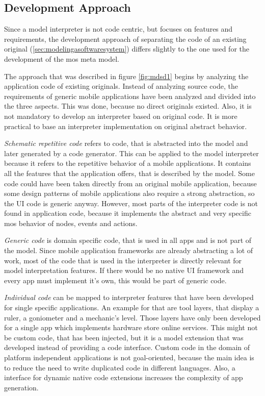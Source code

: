 \subsection{Development Approach}

Since a model interpreter is not code centric, but focuses on features and requirements, the development approach of separating the code of an existing original (\ref{sec:modelingasoftwaresystem}) differs slightly to the one used for the development of the \ac{mos} meta model.

The approach that was described in figure \ref{fig:mdsd1} begins by analyzing the application code of existing originals.
Instead of analyzing source code, the requirements of generic mobile applications have been analyzed and divided into the three aspects.
This was done, because no direct originals existed.
Also, it is not mandatory to develop an interpreter based on original code.
It is more practical to base an interpreter implementation on original abstract behavior.

\textit{Schematic repetitive code} refers to code, that is abstracted into the model and later generated by a code generator.
This can be applied to the model interpreter because it refers to the repetitive behavior of a mobile applications.
It contains all the features that the application offers, that is described by the model.
Some code could have been taken directly from an original mobile application, because some design patterns of mobile applications also require a strong abstraction, so the \ac{UI} code is generic anyway.
However, most parts of the interpreter code is not found in application code, because it implements the abstract and very specific mos behavior of nodes, events and actions.

\textit{Generic code} is domain specific code, that is used in all apps and is not part of the model.
Since mobile application frameworks are already abstracting a lot of work, most of the code that is used in the interpreter is directly relevant for model interpretation features.
If there would be no native \ac{UI} framework and every app must implement it's own, this would be part of generic code.

\textit{Individual code} can be mapped to interpreter features that have been developed for single specific applications.
An example for that are tool layers, that display a ruler, a goniometer and a mechanic's level.
Those layers have only been developed for a single app which implements hardware store online services.
This might not be custom code, that has been injected, but it is a model extension that was developed instead of providing a code interface.
Custom code in the domain of platform independent applications is not goal-oriented, because the main idea is to reduce the need to write duplicated code in different languages.
Also, a interface for dynamic native code extensions increases the complexity of app generation.



